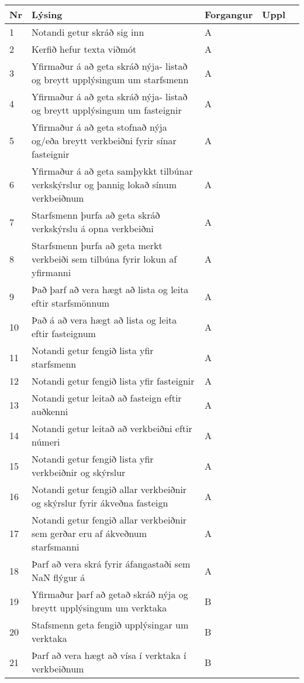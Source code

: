 \documentclass[a4paper]{article}
\begin{document}
\begin{tabular}{|l|l|l|l|l|}
\hline
Nr& Lýsing& Forgangur& Uppl&\\
\hline
1& Notandi getur skráð sig inn & A & &\\
\hline
2& Kerfið hefur texta viðmót & A & &\\
\hline
3& Yfirmaður á að geta skráð nýja-  listað og breytt upplýsingum um starfsmenn & A && \\
\hline
4& Yfirmaður á að geta skráð nýja- listað og breytt upplýsingum um fasteignir & A && \\
\hline
5& Yfirmaður á að geta stofnað nýja og/eða breytt verkbeiðni fyrir sínar fasteignir & A & &\\
\hline
6& Yfirmaður á að geta samþykkt tilbúnar verkskýrslur og þannig lokað sínum verkbeiðnum & A & &\\
\hline
7& Starfsmenn þurfa að geta skráð verkskýrslu á opna verkbeiðni & A & &\\
\hline
8& Starfsmenn þurfa að geta merkt verkbeiði sem tilbúna fyrir lokun af yfirmanni & A & &\\
\hline
9& Það þarf að vera hægt að lista og leita eftir starfsmönnum & A & &\\
\hline
10& Það á að vera hægt að lista og leita eftir fasteignum & A &  &\\
\hline
11& Notandi getur fengið lista yfir starfsmenn & A & &\\
\hline
12& Notandi getur fengið lista yfir fasteignir & A & &\\
\hline
13& Notandi getur leitað að fasteign eftir auðkenni & A & &\\
\hline
14& Notandi getur leitað að verkbeiðni eftir númeri & A & &\\
\hline
15& Notandi getur fengið lista yfir verkbeiðnir og skýrslur & A & &\\
\hline
16& Notandi getur fengið allar verkbeiðnir og skýrslur fyrir ákveðna fasteign & A & &\\
\hline
17& Notandi getur fengið allar verkbeiðnir sem gerðar eru af ákveðnum starfsmanni & A & &\\
\hline
18& Þarf að vera skrá fyrir áfangastaði sem NaN flýgur á & A & &\\
\hline
19& Yfirmaður þarf að getað skráð nýja og breytt upplýsingum um verktaka & B & &\\
\hline
20& Stafsmenn geta fengið upplýsingar um verktaka & B & &\\
\hline
21& Þarf að vera hægt að vísa í verktaka í verkbeiðnum & B & &\\

\end{tabular}
\end{document}
